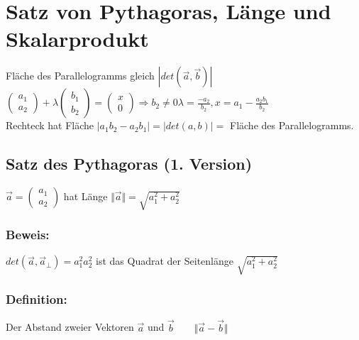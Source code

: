 \section{Satz von Pythagoras, Länge und Skalarprodukt}
%
%
%
%
Fläche des Parallelogramms gleich $|det(\vec{a},\vec{b})|$\\
$\begin{pmatrix} a_{1} \\ a_{2} \end{pmatrix} + \lambda \begin{pmatrix} b_{1} \\ b_{2} \end{pmatrix} = \begin{pmatrix} x \\ 0 \end{pmatrix} \mathop{\Rightarrow}\limits{b_{2} \neq 0} \lambda = \frac{-a_{2}}{b_{2}}, x=a_{1}-\frac{a_{2}b_{1}}{b_{2}}$ \\
Rechteck hat Fläche $\vert a_{1}b_{2}-a_{2}b_{1}\vert=\vert det(a,b) \vert =$ Fläche des Parallelogramms. 
%
%
%
\subsection{Satz des Pythagoras (1. Version)}
$\vec{a} = \begin{pmatrix} a_{1} \\ a_{2} \end{pmatrix}$ hat Länge $\Vert \vec{a} \Vert = \sqrt{a_{1}^{2} + a_{2}^{2}}$
%
%
%
\subsubsection{Beweis:}
$det(\vec{a},\vec{a}_{\perp})=a_{1}^{2}a_{2}^{2}$ ist das Quadrat der Seitenlänge $\sqrt{a_{1}^{2}+a_{2}^{2}}$
%
%
%
\subsubsection{Definition:}
Der Abstand zweier Vektoren $\vec{a}$ und $\vec{b} \qquad \Vert \vec{a}-\vec{b} \Vert$
%
%
%
